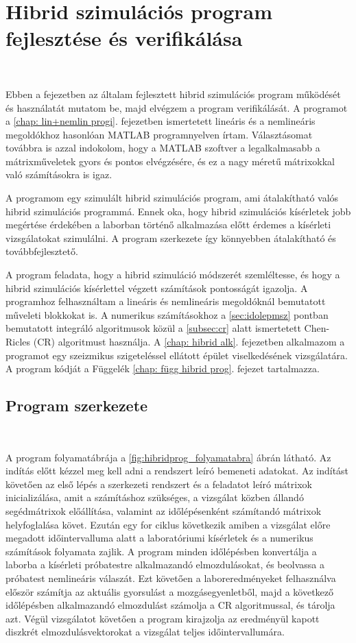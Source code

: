 \chapter[Hibrid szimulációs program]{Hibrid szimulációs program fejlesztése és verifikálása}\label{chap: hibrid progi}

{\ }

Ebben a fejezetben az általam fejlesztett hibrid szimulációs program működését és használatát mutatom be, majd elvégzem a program verifikálását. A programot a \ref{chap: lin+nemlin progi}. fejezetben ismertetett lineáris és a nemlineáris megoldókhoz hasonlóan  MATLAB programnyelven írtam. Választásomat továbbra is azzal indokolom, hogy a MATLAB szoftver a legalkalmasabb a mátrixműveletek gyors és pontos elvégzésére, és ez a  nagy méretű mátrixokkal való számításokra is igaz. 

A programom egy szimulált hibrid szimulációs program, ami átalakítható valós hibrid szimulációs programmá. Ennek oka, hogy hibrid szimulációs kísérletek jobb megértése érdekében a  laborban történő alkalmazása előtt érdemes a kísérleti vizsgálatokat szimulálni. A program szerkezete így könnyebben átalakítható és továbbfejlesztető. 

A program feladata, hogy a hibrid szimuláció módszerét szemléltesse, és hogy a hibrid szimulációs kísérlettel végzett számítások pontosságát igazolja. A programhoz felhasználtam a lineáris és nemlineáris megoldóknál bemutatott műveleti blokkokat is. A numerikus számításokhoz a \ref{sec:idolepmsz} pontban bemutatott integráló algoritmusok közül a \ref{subsec:cr} alatt ismertetett Chen-Ricles (CR) algoritmust használja. A \ref{chap: hibrid alk}. fejezetben  alkalmazom a programot egy szeizmikus szigeteléssel ellátott épület viselkedésének vizsgálatára. A program kódját a Függelék \ref{chap: függ hibrid prog}. fejezet tartalmazza.


\section{Program szerkezete}\label{hibrid prog szerk}

{\ }

A program folyamatábrája a \ref{fig:hibridprog_folyamatabra} ábrán látható. Az indítás előtt  kézzel meg kell adni  a rendszert leíró bemeneti adatokat. Az indítást követően az első lépés   a szerkezeti rendszert és a feladatot leíró mátrixok inicializálása,  amit  a számításhoz szükséges, a vizsgálat közben állandó segédmátrixok előállítása, valamint az időlépésenként  számítandó mátrixok helyfoglalása  követ. Ezután egy for ciklus következik amiben a vizsgálat előre megadott időintervalluma alatt a laboratóriumi kísérletek és a numerikus számítások folyamata zajlik. A program minden időlépésben konvertálja a laborba a kísérleti próbatestre alkalmazandó elmozdulásokat,  és beolvassa  a próbatest nemlineáris  válaszát. Ezt követően a laboreredményeket felhasználva először számítja az aktuális gyorsulást  a mozgásegyenletből, majd a  következő időlépésben alkalmazandó elmozdulást számolja a CR algoritmussal,  és tárolja azt. Végül vizsgálatot követően a program kirajzolja az eredményül kapott diszkrét elmozdulásvektorokat a vizsgálat teljes időintervallumára.

